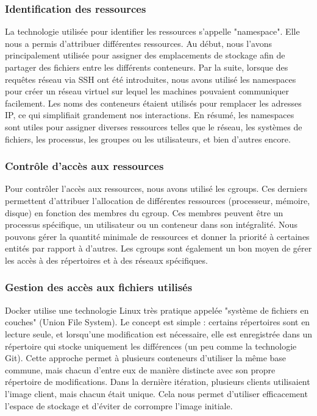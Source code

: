\documentclass[a11paper, 11pt]{article}
\begin{document}
\subsubsection{Identification des ressources}

La technologie utilisée pour identifier les ressources s'appelle "namespace". Elle nous a permis d'attribuer différentes ressources. Au début, nous l'avons principalement utilisée pour assigner des emplacements de stockage afin de partager des fichiers entre les différents conteneurs. Par la suite, lorsque des requêtes réseau via SSH ont été introduites, nous avons utilisé les namespaces pour créer un réseau virtuel sur lequel les machines pouvaient communiquer facilement. Les noms des conteneurs étaient utilisés pour remplacer les adresses IP, ce qui simplifiait grandement nos interactions. En résumé, les namespaces sont utiles pour assigner diverses ressources telles que le réseau, les systèmes de fichiers, les processus, les groupes ou les utilisateurs, et bien d'autres encore.

\subsubsection{Contrôle d'accès aux ressources}

Pour contrôler l'accès aux ressources, nous avons utilisé les cgroups. Ces derniers permettent d'attribuer l'allocation de différentes ressources (processeur, mémoire, disque) en fonction des membres du cgroup. Ces membres peuvent être un processus spécifique, un utilisateur ou un conteneur dans son intégralité. Nous pouvons gérer la quantité minimale de ressources et donner la priorité à certaines entités par rapport à d'autres. Les cgroups sont également un bon moyen de gérer les accès à des répertoires et à des réseaux spécifiques.

\subsubsection{Gestion des accès aux fichiers utilisés}


Docker utilise une technologie Linux très pratique appelée "système de fichiers en couches" (Union File System). Le concept est simple : certains répertoires sont en lecture seule, et lorsqu'une modification est nécessaire, elle est enregistrée dans un répertoire qui stocke uniquement les différences (un peu comme la technologie Git). Cette approche permet à plusieurs conteneurs d'utiliser la même base commune, mais chacun d'entre eux de manière distincte avec son propre répertoire de modifications. Dans la dernière itération, plusieurs clients utilisaient l'image client, mais chacun était unique. Cela nous permet d'utiliser efficacement l'espace de stockage et d'éviter de corrompre l'image initiale.
\end{document}
